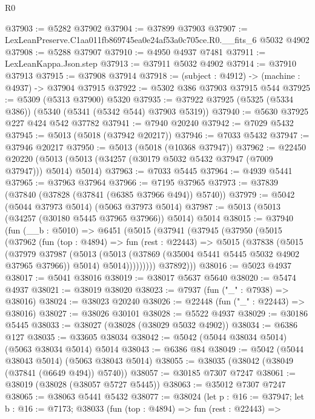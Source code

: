 \begin{lexlean}{R0}
\begin{coremodule}
@37903 := @5282 @37902
@37904 := @37899 @37903
@37907 := LexLeanPreserve.C1aa011fb869745ea0e24af53a0c705ce.R0.__fits_6 @5032 @4902
@37908 := @5288 @37907
@37910 := @4950 @4937 @7481
@37911 := LexLeanKappa.Json.step
@37913 := @37911 @5032 @4902
@37914 := @37910 @37913
@37915 := @37908 @37914
@37918 := (subject : @4912) -> (machine : @4937) -> @37904 @37915
@37922 := @5302 @386 @37903 @37915 @544
@37925 := @5309 (@5313 @37900) @5320
@37935 := @37922 @37925 (@5325 (@5334 @386)) (@5340 (@5341 (@5342 @544) @37903 @5319))
@37940 := @5630 @37925 @227 @424 @542 @37782
@37941 := @7940 @20240
@37942 := @7029 @5432
@37945 := @5013 (@5018 (@37942 @20217))
@37946 := @7033 @5432
@37947 := @37946 @20217
@37950 := @5013 (@5018 (@10368 @37947))
@37962 := @22450
    @20220
    (@5013 (@5013 (@34257 (@30179 @5032 @5432 @37947 (@7009 @37947))) @5014) @5014)
@37963 := @7033 @5445
@37964 := @4939 @5441
@37965 := @37963 @37964
@37966 := @7195 @37965
@37973 := @37839 (@37840 (@37828 (@37841 (@6385 @37966 @494)) @5740))
@37979 := @5042 (@5044 @37973 @5014) (@5063 @37973 @5014)
@37987 := @5013 (@5013 (@34257 (@30180 @5445 @37965 @37966)) @5014) @5014
@38015 := @37940
    (fun (__b : @5010) =>
    @6451
      (@5015
        (@37941
          (@37945
            (@37950
              (@5015
                (@37962
                  (fun (top : @4894) =>
                  fun (rest : @22443) =>
                  @5015
                    (@37838
                      (@5015
                        (@37979
                          @37987
                          (@5013
                            (@5013 (@37869 (@35004 @5441 @5445 @5032 @4902 @37965 @37966)) @5014)
                            @5014)))))))))
          @37892)))
@38016 := @5023 @4937
@38017 := @5041 @38016
@38019 := @38017 @5637 @5640
@38020 := @5474 @4937
@38021 := @38019 @38020
@38023 := @7937 (fun ("_" : @7938) => @38016)
@38024 := @38023 @20240
@38026 := @22448 (fun ("_" : @22443) => @38016)
@38027 := @38026 @30101
@38028 := @5522 @4937
@38029 := @30186 @5445
@38033 := @38027 (@38028 (@38029 @5032 @4902))
@38034 := @6386 @127
@38035 := @33605 @38034
@38042 := @5042 (@5044 @38034 @5014) (@5063 @38034 @5014) @5014
@38043 := @6386 @84
@38049 := @5042 (@5044 @38043 @5014) (@5063 @38043 @5014)
@38055 := @38035 (@38042 (@38049 (@37841 (@6649 @494)) @5740))
@38057 := @30185 @7307 @7247
@38061 := @38019 (@38028 (@38057 @5727 @5445))
@38063 := @35012 @7307 @7247
@38065 := @38063 @5441 @5432
@38077 := @38024
    (let p : @16 := @37947;
    let b : @16 := @7173;
    @38033
      (fun (top : @4894) =>
      fun (rest : @22443) =>

\end{coremodule}
\end{lexlean}
